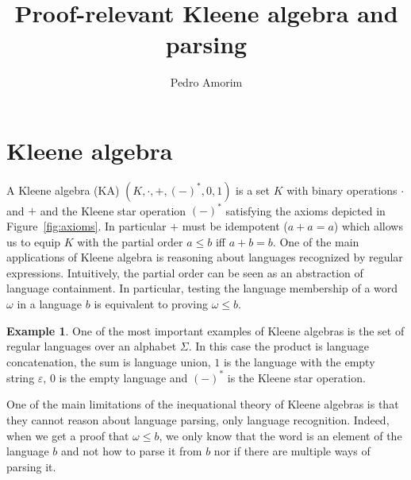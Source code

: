 \documentclass[12pt,a4paper]{article}
\numberwithin{equation}{section}
\theoremstyle{plain}
\theoremstyle{definition}
\newtheorem{example}[theorem]{Example}
\begin{document}
\title{Proof-relevant Kleene algebra and parsing}

\author{Pedro Amorim}

\maketitle


\section{Kleene algebra}

A Kleene algebra (KA) $(K, \cdot, +, (-)^*, 0 , 1)$ is a set $K$ with binary operations $\cdot$ and $+$ and the Kleene star operation $(-)^*$ satisfying the axioms depicted in Figure~\ref{fig:axioms}. In particular $+$ must be idempotent ($a + a = a$) which allows us to equip $K$ with the partial order $a \leq b$ iff $a + b = b$. One of the main applications of Kleene algebra is reasoning about languages recognized by regular expressions. Intuitively, the partial order can be seen as an abstraction of language containment. In particular, testing the language membership of a word $\omega$ in a language $b$ is equivalent to proving $\omega \leq b$.

\begin{example}
  One of the most important examples of Kleene algebras is the set of regular languages over an alphabet $\Sigma$. In this case the product is language concatenation, the sum is language union, $1$ is the language with the empty string $\varepsilon$, $0$ is the empty language and $(-)^*$ is the Kleene star operation.
\end{example}

One of the main limitations of the inequational theory of Kleene algebras is that they cannot reason about language parsing, only language recognition. Indeed, when we get a proof that $\omega \leq b$, we
only know that the word is an element of the language $b$ and not how to parse it from $b$ nor if
there are multiple ways of parsing it.
\end{document}
